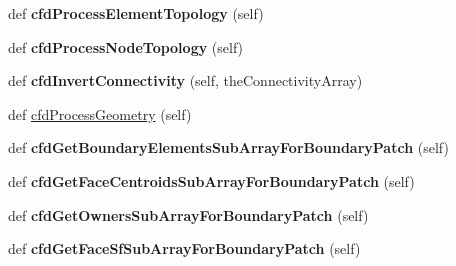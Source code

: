 \begin{DoxyCompactItemize}
\mbox{\label{classpy_f_v_m_1_1_polymesh_1_1_polymesh_aec809dd37a126d259351a9048af98c16}} 
def {\bfseries cfd\+Process\+Element\+Topology} (self)
\item 
\mbox{\label{classpy_f_v_m_1_1_polymesh_1_1_polymesh_a69d4d25f89eb9942c2a5bf3aec916b7b}} 
def {\bfseries cfd\+Process\+Node\+Topology} (self)
\item 
\mbox{\label{classpy_f_v_m_1_1_polymesh_1_1_polymesh_a3479b5edaa81ce539e524575ad3828c0}} 
def {\bfseries cfd\+Invert\+Connectivity} (self, the\+Connectivity\+Array)
\item 
def \mbox{\hyperlink{classpy_f_v_m_1_1_polymesh_1_1_polymesh_a2fa259d2909a26b6b1b770bbd7dcf2aa}{cfd\+Process\+Geometry}} (self)
\item 
\mbox{\label{classpy_f_v_m_1_1_polymesh_1_1_polymesh_a8b5100f3d23e7a037452012afa59d787}} 
def {\bfseries cfd\+Get\+Boundary\+Elements\+Sub\+Array\+For\+Boundary\+Patch} (self)
\item 
\mbox{\label{classpy_f_v_m_1_1_polymesh_1_1_polymesh_a86422def9ffddce8156c653947ca9e1d}} 
def {\bfseries cfd\+Get\+Face\+Centroids\+Sub\+Array\+For\+Boundary\+Patch} (self)
\item 
\mbox{\label{classpy_f_v_m_1_1_polymesh_1_1_polymesh_a714aba33977c12a3eb79e1ac2241fc39}} 
def {\bfseries cfd\+Get\+Owners\+Sub\+Array\+For\+Boundary\+Patch} (self)
\item 
\mbox{\label{classpy_f_v_m_1_1_polymesh_1_1_polymesh_a913f8de3877c61fba9934c64933000ee}} 
def {\bfseries cfd\+Get\+Face\+Sf\+Sub\+Array\+For\+Boundary\+Patch} (self)
\end{DoxyCompactItemize}
